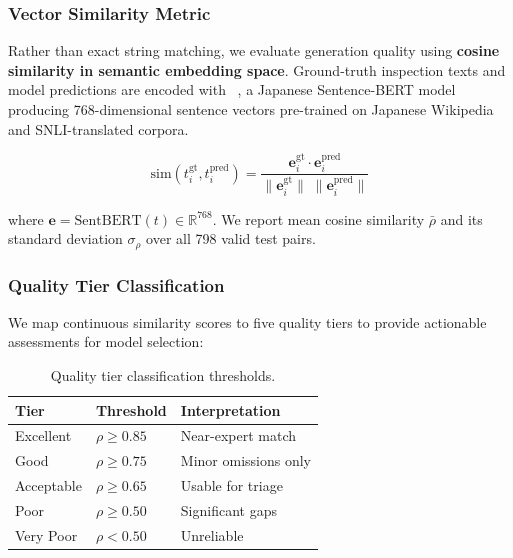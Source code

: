 \documentclass[twocolumn]{article}
\begin{document}
\subsubsection{Vector Similarity Metric}

Rather than exact string matching, we evaluate generation quality using
\textbf{cosine similarity in semantic embedding space}.
Ground-truth inspection texts and model predictions are encoded with
~\cite{sonoisa2021sbert},
a Japanese Sentence-BERT model producing 768-dimensional sentence vectors
pre-trained on Japanese Wikipedia and SNLI-translated corpora.

\begin{equation}
  \text{sim}(t_i^{\text{gt}}, t_i^{\text{pred}}) =
  \frac{\mathbf{e}_i^{\text{gt}} \cdot \mathbf{e}_i^{\text{pred}}}
       {\|\mathbf{e}_i^{\text{gt}}\| \;\|\mathbf{e}_i^{\text{pred}}\|}
  \label{eq:cosine}
\end{equation}

where $\mathbf{e} = \text{SentBERT}(t) \in \mathbb{R}^{768}$.
We report mean cosine similarity $\bar{\rho}$ and its standard deviation
$\sigma_\rho$ over all 798 valid test pairs.

\subsubsection{Quality Tier Classification}

We map continuous similarity scores to five quality tiers to provide
actionable assessments for model selection:

\begin{table}[h]
\centering
\caption{Quality tier classification thresholds.}
\label{tab:quality_tiers}
\begin{tabular}{lll}
\toprule
\textbf{Tier} & \textbf{Threshold} & \textbf{Interpretation} \\
\midrule
Excellent  & $\rho \geq 0.85$ & Near-expert match \\
Good       & $\rho \geq 0.75$ & Minor omissions only \\
Acceptable & $\rho \geq 0.65$ & Usable for triage \\
Poor       & $\rho \geq 0.50$ & Significant gaps \\
Very Poor  & $\rho <  0.50$   & Unreliable \\
\bottomrule
\end{tabular}
\end{table}
\end{document}
